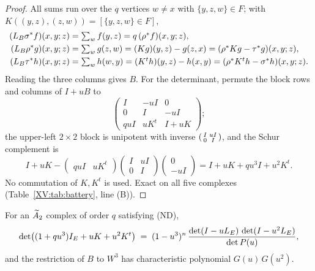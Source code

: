 \begin{proof}
All sums run over the $q$ vertices $w\ne x$ with $\{y,z,w\}\in F$; with
$K((y,z),(z,w))=[\{y,z,w\}\in F]$,
\begin{align*}
(L_B\sigma^{*}f)(x,y;z)&=\textstyle\sum_{w}f(y,z)=q\,(\rho^{*}f)(x,y;z),\\
(L_B\rho^{*}g)(x,y;z)&=\textstyle\sum_{w}g(z,w)=(Kg)(y,z)-g(z,x)=(\rho^{*}Kg-\tau^{*}g)(x,y;z),\\
(L_B\tau^{*}h)(x,y;z)&=\textstyle\sum_{w}h(w,y)=(K^{t}h)(y,z)-h(x,y)=(\rho^{*}K^{t}h-\sigma^{*}h)(x,y;z).
\end{align*}
Reading the three columns gives $B$. For the determinant, permute the block rows and columns
of $I+uB$ to
\[
\begin{pmatrix}I&-uI&0\\0&I&-uI\\quI&uK^{t}&I+uK\end{pmatrix};
\]
the upper-left $2\times2$ block is unipotent with inverse
$\begin{psmallmatrix}I&uI\\0&I\end{psmallmatrix}$, and the Schur complement is
\[
I+uK-\begin{pmatrix}quI&uK^{t}\end{pmatrix}\begin{pmatrix}I&uI\\0&I\end{pmatrix}
\begin{pmatrix}0\\-uI\end{pmatrix}=I+uK+qu^{3}I+u^{2}K^{t}.
\]
No commutation of $K,K^{t}$ is used. Exact on all five complexes (Table~\ref{XV:tab:battery},
line (B)).
\end{proof}

\begin{theorem}\label{XV:thm:KLcomp}
For an $\widetilde A_2$ complex of order $q$ satisfying {\rm(ND)},
\[
\det\bigl((1+qu^{3})I_E+uK+u^{2}K^{t}\bigr)\;=\;(1-u^{3})^{n}\,
\frac{\det(I-uL_E)\,\det(I-u^{2}L_E)}{\det P(u)} ,
\]
and the restriction of $B$ to $W^{3}$ has characteristic polynomial $G(u)\,G(u^{2})$.
\end{theorem}

